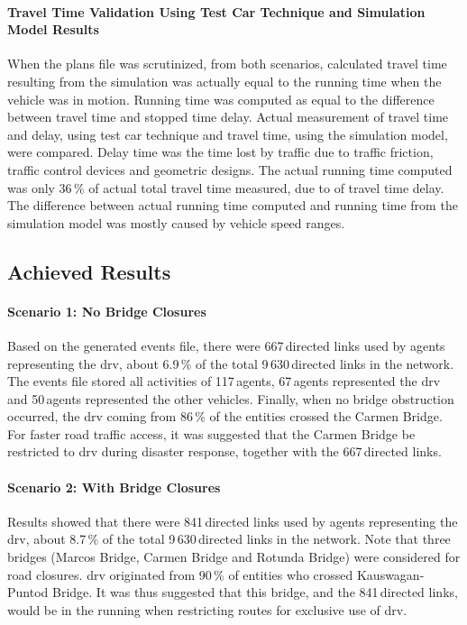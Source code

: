 \paragraph{Travel Time Validation Using Test Car Technique and Simulation Model Results}
When the plans file was scrutinized, from both scenarios, calculated travel time resulting from the simulation was actually equal to the running time when the vehicle was in motion. Running time was computed as equal to the difference between travel time and stopped time delay. Actual measurement of travel time and delay, using test car technique \citep[][]{Sigua_2008} and travel time, using the simulation model, were compared. Delay time was the time lost by traffic due to traffic friction, traffic control devices and geometric designs. The actual running time computed was only 36\,\% of actual total travel time measured, due to of travel time delay. The difference between actual running time computed and running time from the simulation model was mostly caused by vehicle speed ranges. 

\subsection{Achieved Results}
\paragraph{Scenario 1: No Bridge Closures}
Based on the generated events file, there were 667\,directed links used by agents representing the \gls{drv}, about 6.9\,\% of the total 9\,630\,directed links in the network. The events file stored all activities of 117\,agents, 67\,agents represented the \gls{drv} and 50\,agents represented the other vehicles. Finally, when no bridge obstruction occurred, the \gls{drv} coming from 86\,\% of the entities crossed the Carmen Bridge. For faster road traffic access, it was suggested that the Carmen Bridge be restricted to \gls{drv} during disaster response, together with the 667\,directed links.

\paragraph{Scenario 2: With Bridge Closures}
Results showed that there were 841\,directed links used by agents representing the \gls{drv}, about 8.7\,\% of the total 9\,630\,directed links in the network. Note that three bridges (\ie Marcos Bridge, Carmen Bridge and Rotunda Bridge) were considered for road closures. \gls{drv} originated from 90\,\% of entities who crossed  Kauswagan-Puntod Bridge. It was thus suggested that this bridge, and the 841\,directed links, would be in the running when restricting routes for exclusive use of \gls{drv}.

